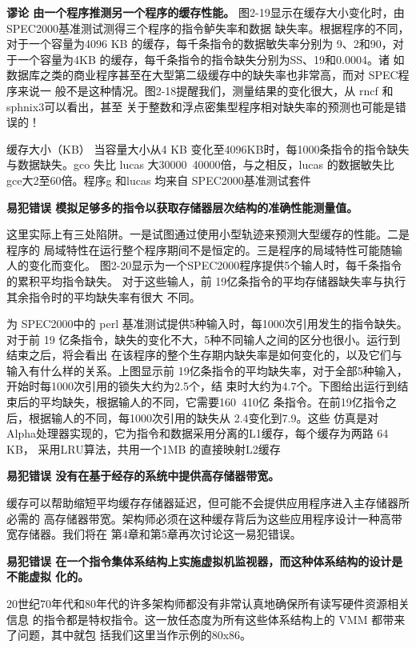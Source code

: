 \textbf{谬论 由一个程序推测另一个程序的缓存性能。}
图2-19显示在缓存大小变化时，由 SPEC2000基准测试测得三个程序的指令鲈失率和数据
缺失率。根据程序的不同，对于一个容量为4096 KB 的缓存，每千条指令的数据敏失率分别为
9、2和90，对于一个容量为4KB 的缓存，每千条指令的指令缺失分别为SS、19和0.0004。诸
如数据库之类的商业程序甚至在大型第二级缓存中的缺失率也非常高，而对 SPEC程序来说一
般不是这种情况。图2-18提醒我们，测量结果的变化很大，从 rncf 和 sphnix3可以看出，甚至
关于整数和浮点密集型程序相对缺失率的预测也可能是错误的！

缓存大小（KB）
当容量大小从4 KB 变化至4096KB时，每1000条指令的指令缺失与数据缺失。gco
失比 lucas 大30000~40000倍，与之相反，lucas 的数据敏失比 gce大2至60倍。程序g
和lucas 均来自 SPEC2000基准测试套件

\textbf{易犯错误 模拟足够多的指令以获取存储器层次结构的准确性能测量值。}

这里实际上有三处陷阱。一是试图通过使用小型轨迹来预测大型缓存的性能。二是程序的
局域特性在运行整个程序期间不是恒定的。三是程序的局域特性可能随输人的变化而变化。
图2-20显示为一个SPEC2000程序提供5个输人时，每千条指令的累积平均指令缺失。
对于这些输人，前 19亿条指令的平均存储器缺失率与执行其余指令时的平均缺失率有很大
不同。

为 SPEC2000中的 perl 基准测试提供5种输入时，每1000次引用发生的指令缺失。对于前
19 亿条指令，缺失的变化不大，5种不同输人之间的区分也很小。运行到结束之后，将会看出
在该程序的整个生存期内缺失率是如何变化的，以及它们与输入有什么样的关系。上图显示前
19亿条指令的平均缺失率，对于全部5种输入，开始时每1000次引用的锁失大约为2.5个，结
束时大约为4.7个。下图给出运行到结束后的平均缺失，根据输人的不同，它需要160~410亿
条指令。在前19亿指令之后，根据输人的不同，每1000次引用的缺失从 2.4变化到7.9。这些
仿真是对 Alpha处理器实现的，它为指令和数据采用分离的L1缓存，每个缓存为两路 64 KB，
采用LRU算法，共用一个1MB 的直接映射L2缓存

\textbf{易犯错误 没有在基于经存的系统中提供高存储器带宽。}

缓存可以帮助缩短平均缓存存储器延迟，但可能不会提供应用程序进入主存储器所必需的
高存储器带宽。架构师必须在这种缓存背后为这些应用程序设计一种高带宽存储器。我们将在
第4章和第5章再次讨论这一易犯错误。

\textbf{易犯错误 在一个指令集体系结构上实施虚拟机监视器，而这种体系结构的设计是不能虚拟
化的。}

20世纪70年代和80年代的许多架构师都没有非常认真地确保所有读写硬件资源相关信息
的指令都是特权指令。这一放任态度为所有这些体系结构上的 VMM 都带来了问题，其中就包
括我们这里当作示例的80x86。

